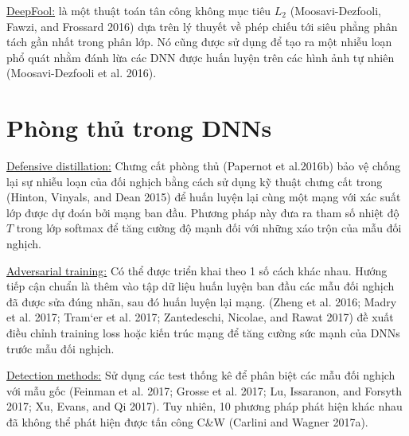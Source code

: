 \underline{DeepFool:} là một thuật toán tân công không mục tiêu $L_2$ (Moosavi-Dezfooli, 
Fawzi, and Frossard 2016) dựa trên lý thuyết về phép chiếu tới siêu phẳng phân tách gần nhất
trong phân lớp. Nó cũng được sử dụng để tạo ra một nhiễu loạn phổ quát nhằm đánh lừa 
các DNN được huấn luyện trên các hình ảnh tự nhiên (Moosavi-Dezfooli et al. 2016).

\section{Phòng thủ trong DNNs}
\underline{Defensive distillation:} Chưng cất phòng thủ (Papernot et al.2016b) bảo vệ 
chống lại sự nhiễu loạn của đối nghịch bằng cách sử dụng kỹ thuật chưng cất trong (Hinton, 
Vinyals, and Dean 2015) để huấn luyện lại cùng một mạng với xác suất lớp được dự đoán bởi 
mạng ban đầu. Phương pháp này đưa ra tham số nhiệt độ $T$ trong lớp softmax để tăng cường 
độ mạnh đối với những xáo trộn của mẫu đối nghịch.

\underline{Adversarial training:} Có thể được triển khai theo 1 số cách khác nhau. 
Hướng tiếp cận chuẩn là thêm vào tập dữ liệu huấn luyện ban đầu các mẫu đối nghịch đã được 
sửa đúng nhãn, sau đó huấn luyện lại mạng. (Zheng et al. 2016; Madry et al. 2017; 
Tram`er et al. 2017; Zantedeschi, Nicolae, and Rawat 2017) đề xuất điều chỉnh training 
loss hoặc kiến trúc mạng để tăng cường sức mạnh của DNNs trước mẫu đối nghịch.

\underline{Detection methods:} Sử dụng các test thống kê để phân biệt các mẫu đối nghịch 
với mẫu gốc (Feinman et al. 2017; Grosse et al. 2017; Lu, Issaranon, and Forsyth 2017; 
Xu, Evans, and Qi 2017). Tuy nhiên, 10 phương pháp phát hiện khác nhau đã không thể phát 
hiện được tấn công C\&W (Carlini and Wagner 2017a).